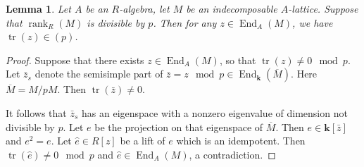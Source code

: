 \documentclass[12pt,letterpaper]{amsart}
\theoremstyle{plain}
\newtheorem{lemma}{Lemma}[section]
\theoremstyle{definition}
\DeclareMathOperator{\tr}{tr}
\DeclareMathOperator{\End}{End}
\DeclareMathOperator{\rank}{rank}
\begin{document}
\begin{lemma}\label{indecomposable-trace}
Let $A$ be an $R$-algebra, let $M$ be an indecomposable $A$-lattice. Suppose that $\rank_R(M)$  is divisible by $p$. 
Then for any $z\in \End_A(M)$,  we have $\tr(z)\in (p)$.

    
\end{lemma}
\begin{proof}
Suppose that there exists $z\in \End_A(M)$,  so that $\tr(z)\neq 0 \mod p$. Let $\bar{z}_{s}$  denote the semisimple part
of $\bar{z}=z\mod p\in \End_{\mathbf{k}}(\overline{M})$. Here $\overline{M}=M/pM$. Then $\tr(\bar{z})\neq 0$. 

It follows that $\bar{z}_{s}$  has an eigenspace with a nonzero eigenvalue of dimension not divisible by $p$. Let $e$ be the projection on that eigenspace of
$\overline{M}$.  Then $e\in \mathbf{k}[\bar{z}]$  and $e^2=e$.  Let $\hat{e}\in R[z]$  be a lift of $e$ which is an idempotent. Then $\tr(\hat{e})\neq 0 \mod p$
and $\hat{e}\in \End_A(M)$,  a contradiction.

\end{proof}
\end{document}
